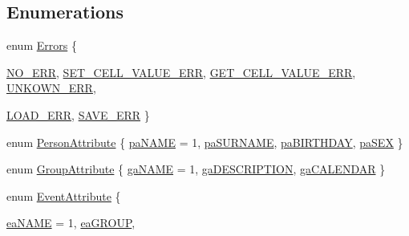 \subsection*{Enumerations}
\begin{DoxyCompactItemize}
\item 
enum \hyperlink{namespacestorage_aedd3c880e9744762de535deb2adcf6be}{Errors} \{ \par
\hyperlink{namespacestorage_aedd3c880e9744762de535deb2adcf6beab022daa71e205b32600c42a71cd8abd9}{NO\_\-ERR}, 
\hyperlink{namespacestorage_aedd3c880e9744762de535deb2adcf6beacdf2bfcf9aa6c81b977b6f0385c4022f}{SET\_\-CELL\_\-VALUE\_\-ERR}, 
\hyperlink{namespacestorage_aedd3c880e9744762de535deb2adcf6bea9b9b601c702875135dbaadc17ca376a7}{GET\_\-CELL\_\-VALUE\_\-ERR}, 
\hyperlink{namespacestorage_aedd3c880e9744762de535deb2adcf6bea1741e738e284508e65564b0a43330a59}{UNKOWN\_\-ERR}, 
\par
\hyperlink{namespacestorage_aedd3c880e9744762de535deb2adcf6bea1fb229c8079685007285aed87f0602a6}{LOAD\_\-ERR}, 
\hyperlink{namespacestorage_aedd3c880e9744762de535deb2adcf6bea0b2da9195c17eb6b12af46eccc47d558}{SAVE\_\-ERR}
 \}
\item 
enum \hyperlink{namespacestorage_a42f9d3eac07801f5551c7e5b60d6e9ce}{PersonAttribute} \{ \hyperlink{namespacestorage_a42f9d3eac07801f5551c7e5b60d6e9cea1a0f7411f00da5302897feff12e8361f}{paNAME} =  1, 
\hyperlink{namespacestorage_a42f9d3eac07801f5551c7e5b60d6e9cea708252563a34f476cf90705693d55b07}{paSURNAME}, 
\hyperlink{namespacestorage_a42f9d3eac07801f5551c7e5b60d6e9ceadf021b738f83eb0b014c0147b956f3e5}{paBIRTHDAY}, 
\hyperlink{namespacestorage_a42f9d3eac07801f5551c7e5b60d6e9cea94eecc998962827237971a4d82f01f01}{paSEX}
 \}
\item 
enum \hyperlink{namespacestorage_abe112dd5cc72469c2ce28e3a5ea229a3}{GroupAttribute} \{ \hyperlink{namespacestorage_abe112dd5cc72469c2ce28e3a5ea229a3aa8a524c714d5a7811887d5359a7e84c6}{gaNAME} =  1, 
\hyperlink{namespacestorage_abe112dd5cc72469c2ce28e3a5ea229a3a8ef4cc8b5d42e1c5851051c5e1fd07ca}{gaDESCRIPTION}, 
\hyperlink{namespacestorage_abe112dd5cc72469c2ce28e3a5ea229a3aebbb8aa2ae07068925c36353edd3a174}{gaCALENDAR}
 \}
\item 
enum \hyperlink{namespacestorage_a6e2b156f6c0c979e3e6d80ed6ba55420}{EventAttribute} \{ \par
\hyperlink{namespacestorage_a6e2b156f6c0c979e3e6d80ed6ba55420a43533b6f3a1c1ec7875ba3a8d4d9f8fe}{eaNAME} =  1, 
\hyperlink{namespacestorage_a6e2b156f6c0c979e3e6d80ed6ba55420a49ada458bc7f0c2f1f2c497f029fa907}{eaGROUP}, 

\end{DoxyCompactItemize}
